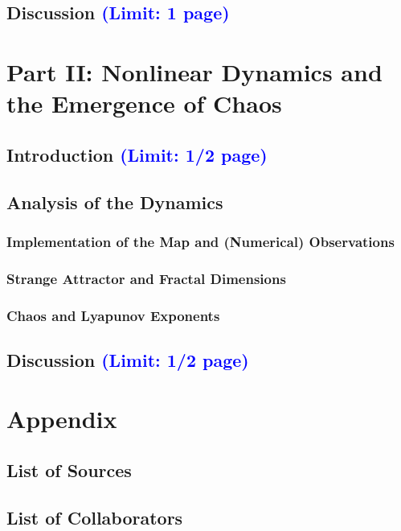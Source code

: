 \documentclass[11pt,titlepage]{article}
\begin{document}
\subsection{Discussion \textcolor{blue}{(Limit: 1 page)}} %

\newpage
\section{Part II: Nonlinear Dynamics and the Emergence of Chaos}


\subsection{Introduction \textcolor{blue}{(Limit: 1/2 page)}} %
\subsection{Analysis of the Dynamics}
\subsubsection{Implementation of the Map and (Numerical) Observations}
\subsubsection{Strange Attractor and Fractal Dimensions}
\subsubsection{Chaos and Lyapunov Exponents}
\subsection{Discussion \textcolor{blue}{(Limit: 1/2 page)}} %





\clearpage
\appendix
\section*{Appendix}
\subsection*{List of Sources}

\subsection*{List of Collaborators}
\end{document}

